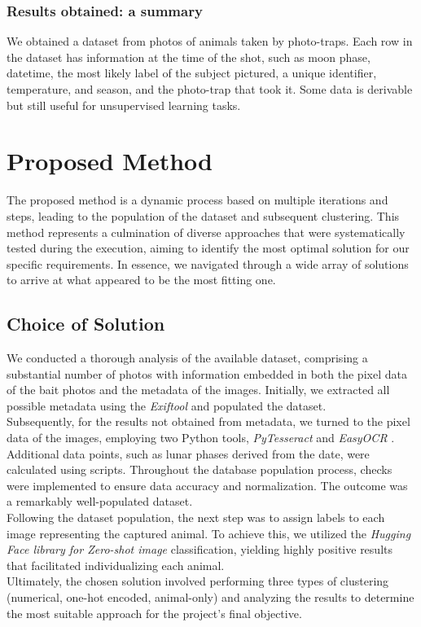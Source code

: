 \documentclass[12pt,a4paper,twoside]{article}
\begin{document}
\subsubsection{Results obtained: a summary}
We obtained a dataset from photos of animals taken by photo-traps. Each row in the dataset has information at the time of the shot, such as moon phase, datetime, the most likely label of the subject pictured, a unique identifier, temperature, and season, and the photo-trap that took it. Some data is derivable but still useful for unsupervised learning tasks.

\newpage
\section{Proposed Method}
The proposed method is a dynamic process based on multiple iterations and steps, leading to the population of the dataset and subsequent clustering. This method represents a culmination of diverse approaches that were systematically tested during the execution, aiming to identify the most optimal solution for our specific requirements. In essence, we navigated through a wide array of solutions to arrive at what appeared to be the most fitting one.

\subsection{Choice of Solution}
We conducted a thorough analysis of the available dataset, comprising a substantial number of photos with information embedded in both the pixel data of the bait photos and the metadata of the images. Initially, we extracted all possible metadata using the \textit{Exiftool} \cite{exiftool} and populated the dataset.\\
Subsequently, for the results not obtained from metadata, we turned to the pixel data of the images, employing two Python tools, \textit{PyTesseract} \cite{pytesseract} and \textit{EasyOCR} \cite{easyocr}. Additional data points, such as lunar phases derived from the date, were calculated using scripts. Throughout the database population process, checks were implemented to ensure data accuracy and normalization. The outcome was a remarkably well-populated dataset. \\
Following the dataset population, the next step was to assign labels to each image representing the captured animal. To achieve this, we utilized the \textit{Hugging Face library for Zero-shot image} \cite{huggingface} classification, yielding highly positive results that facilitated individualizing each animal. \\
Ultimately, the chosen solution involved performing three types of clustering (numerical, one-hot encoded, animal-only) and analyzing the results to determine the most suitable approach for the project's final objective.
\end{document}
